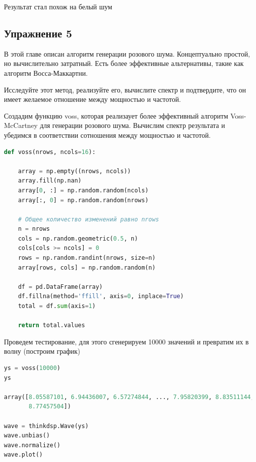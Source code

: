 Результат стал похож на белый шум


\subsection{Упражнение 5}

В этой главе описан алгоритм генерации розового шума. Концептуально простой, но вычислительно затратный. Есть более эффективные альтернативы, такие как алгоритм Восса-Маккартни.

\noindent Исследуйте этот метод, реализуйте его, вычислите спектр и подтвердите, что он имеет желаемое отношение между мощностью и частотой.

Создадим функцию voss, которая реализаует более эффективный алгоритм Voss-McCartney для генерации розового шума. Вычислим спектр результата и убедимся в соответствии сотношения между мощностью и частотой.

\begin{lstlisting}[language=Python]
def voss(nrows, ncols=16):

    array = np.empty((nrows, ncols))
    array.fill(np.nan)
    array[0, :] = np.random.random(ncols)
    array[:, 0] = np.random.random(nrows)
    
    # Общее количество изменений равно nrows
    n = nrows
    cols = np.random.geometric(0.5, n)
    cols[cols >= ncols] = 0
    rows = np.random.randint(nrows, size=n)
    array[rows, cols] = np.random.random(n)

    df = pd.DataFrame(array)
    df.fillna(method='ffill', axis=0, inplace=True)
    total = df.sum(axis=1)

    return total.values
\end{lstlisting}

Проведем тестирование, для этого сгенерируем 10000 значений и превратим их в волну (построим график)

\begin{lstlisting}[language=Python]
ys = voss(10000)
ys

array([8.05587101, 6.94436007, 6.57274844, ..., 7.95820399, 8.83511144,
       8.77457504])
       
wave = thinkdsp.Wave(ys)
wave.unbias()
wave.normalize()
wave.plot()
\end{lstlisting}

